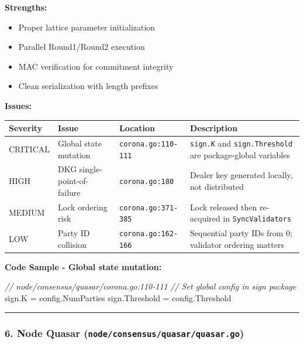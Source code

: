 \documentclass[
]{article}
\newenvironment{Shaded}{}{}
\newcommand{\CommentTok}[1]{\textcolor[rgb]{0.38,0.63,0.69}{\textit{#1}}}
\newcommand{\NormalTok}[1]{#1}
\newcommand{\OperatorTok}[1]{\textcolor[rgb]{0.40,0.40,0.40}{#1}}
\newcounter{none} %
\providecommand{\tightlist}{%
  \setlength{\itemsep}{0pt}\setlength{\parskip}{0pt}}
\begin{document}
\textbf{Strengths:}

\begin{itemize}
\tightlist
\item
  Proper lattice parameter initialization
\item
  Parallel Round1/Round2 execution
\item
  MAC verification for commitment integrity
\item
  Clean serialization with length prefixes
\end{itemize}

\textbf{Issues:}

{\def\LTcaptype{none} %
\begin{longtable}[]{@{}llll@{}}
\toprule\noalign{}
Severity & Issue & Location & Description \\
\midrule\noalign{}
\endhead
\bottomrule\noalign{}
\endlastfoot
CRITICAL & Global state mutation & \texttt{corona.go:110-111} &
\texttt{sign.K} and \texttt{sign.Threshold} are package-global
variables \\
HIGH & DKG single-point-of-failure & \texttt{corona.go:180} & Dealer
key generated locally, not distributed \\
MEDIUM & Lock ordering risk & \texttt{corona.go:371-385} & Lock
released then re-acquired in \texttt{SyncValidators} \\
LOW & Party ID collision & \texttt{corona.go:162-166} & Sequential
party IDs from 0; validator ordering matters \\
\end{longtable}
}

\textbf{Code Sample - Global state mutation:}

\begin{Shaded}
\begin{Highlighting}[]
\CommentTok{// node/consensus/quasar/corona.go:110{-}111}
\CommentTok{// Set global config in sign package}
\NormalTok{sign}\OperatorTok{.}\NormalTok{K }\OperatorTok{=}\NormalTok{ config}\OperatorTok{.}\NormalTok{NumParties}
\NormalTok{sign}\OperatorTok{.}\NormalTok{Threshold }\OperatorTok{=}\NormalTok{ config}\OperatorTok{.}\NormalTok{Threshold}
\end{Highlighting}
\end{Shaded}

\begin{center}\rule{0.5\linewidth}{0.5pt}\end{center}

\subsubsection{\texorpdfstring{6. Node Quasar
(\texttt{node/consensus/quasar/quasar.go})}{6. Node Quasar (node/consensus/quasar/quasar.go)}}\label{6-node-quasar-nodeconsensusquasarquasargo}
\end{document}
